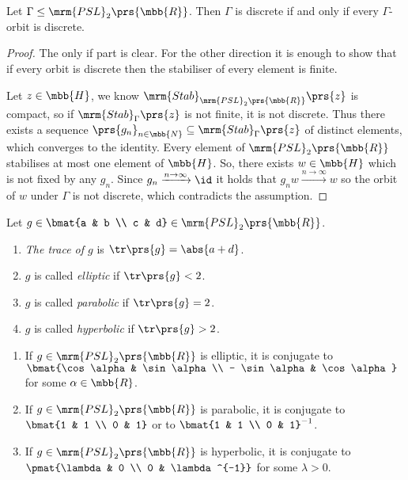 \documentclass[10pt, twoside]{book}
\begin{document}
\begin{corollary}
Let $\Gamma \leq \mrm{PSL}_2\prs{\mbb{R}}$. Then $\Gamma$ is discrete if and only if every $\Gamma$-orbit is discrete.
\end{corollary}

\begin{proof}
The only if part is clear. For the other direction it is enough to show that if every orbit is discrete then the stabiliser of every element is finite.

Let $z \in \mbb{H}$, we know
$\mrm{Stab}_{\mrm{PSL}_2\prs{\mbb{R}}}\prs{z}$
is compact, so if $\mrm{Stab}_\Gamma\prs{z}$ is not finite, it is not discrete. Thus there exists a sequence $\prs{g_n}_{n \in \mbb{N}} \subseteq \mrm{Stab}_{\Gamma}\prs{z}$ of distinct elements, which converges to the identity.
Every element of $\mrm{PSL}_2\prs{\mbb{R}}$ stabilises at most one element of $\mbb{H}$. So, there exists $w \in \mbb{H}$ which is not fixed by any $g_n$. Since $g_n \xrightarrow{n\to\infty} \id$ it holds that $g_n w \xrightarrow{n\to\infty} w$ so the orbit of $w$ under $\Gamma$ is not discrete, which contradicts the assumption.
\end{proof}

\begin{definition}
Let $g \in \bmat{a & b \\ c & d} \in \mrm{PSL}_2\prs{\mbb{R}}$.
\begin{enumerate}
\item \emph{The trace of $g$} is $\tr\prs{g} = \abs{a+d}$.
\item $g$ is called \emph{elliptic} if $\tr\prs{g} < 2$.
\item $g$ is called \emph{parabolic} if $\tr\prs{g}=2$.
\item $g$ is called \emph{hyperbolic} if $\tr\prs{g} > 2$.
\end{enumerate}
\end{definition}

\begin{lemma} \label{lemma:conjugate_elements_in_subgroups_of_PSL_2}
\begin{enumerate}
\item If $g \in \mrm{PSL}_2\prs{\mbb{R}}$ is elliptic, it is conjugate to $\bmat{\cos \alpha & \sin \alpha \\ - \sin\alpha & \cos\alpha}$ for some $\alpha \in \mbb{R}$.

\item If $g \in \mrm{PSL}_2\prs{\mbb{R}}$ is parabolic, it is conjugate to $\bmat{1 & 1 \\ 0 & 1}$ or to $\bmat{1 & 1 \\ 0 & 1}^{-1}$.

\item If $g \in \mrm{PSL}_2\prs{\mbb{R}}$ is hyperbolic, it is conjugate to $\pmat{\lambda & 0 \\ 0 & \lambda^{-1}}$ for some $\lambda > 0$.
\end{enumerate}
\end{lemma}
\end{document}
